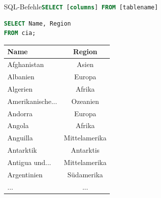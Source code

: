\begin{frame}[fragile]{SQL-Befehle}{\lstinline[language=SQL]|SELECT [columns] FROM [tablename]|}
\begin{lstlisting}[language=SQL, basicstyle=\ttfamily\scriptsize]
SELECT Name, Region
FROM cia;
\end{lstlisting}

\begin{table}
  \centering
  \tiny
  \begin{tabular}{lc}
    \toprule
    \textbf{Name} & \textbf{Region} \\
    \midrule
    Afghanistan & Asien \\
    Albanien & Europa \\
    Algerien & Afrika \\
    Amerikanische... & Ozeanien \\
    Andorra & Europa \\
    Angola & Afrika \\
    Anguilla & Mittelamerika \\
    Antarktik & Antarktis \\
    Antigua und... & Mittelamerika \\
    Argentinien & Südamerika \\
    \midrule
    ... & ... \\
    \bottomrule
  \end{tabular}
\end{table}
\end{frame}

